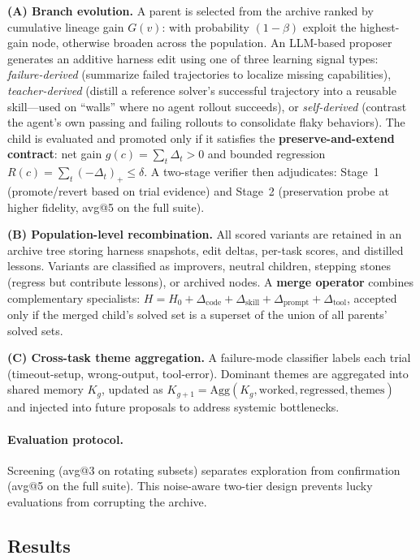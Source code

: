 \documentclass[11pt,a4paper]{article}
\begin{document}
\textbf{(A) Branch evolution.} A parent is selected from the archive ranked by cumulative lineage gain $G(v)$: with probability $(1-\beta)$ exploit the highest-gain node, otherwise broaden across the population. An LLM-based proposer generates an additive harness edit using one of three learning signal types: \emph{failure-derived} (summarize failed trajectories to localize missing capabilities), \emph{teacher-derived} (distill a reference solver's successful trajectory into a reusable skill---used on ``walls'' where no agent rollout succeeds), or \emph{self-derived} (contrast the agent's own passing and failing rollouts to consolidate flaky behaviors). The child is evaluated and promoted only if it satisfies the \textbf{preserve-and-extend contract}: net gain $g(c) = \sum_t \Delta_t > 0$ and bounded regression $R(c) = \sum_t (-\Delta_t)_+ \leq \delta$. A two-stage verifier then adjudicates: Stage~1 (promote/revert based on trial evidence) and Stage~2 (preservation probe at higher fidelity, avg@5 on the full suite).

\textbf{(B) Population-level recombination.} All scored variants are retained in an archive tree storing harness snapshots, edit deltas, per-task scores, and distilled lessons. Variants are classified as improvers, neutral children, stepping stones (regress but contribute lessons), or archived nodes. A \textbf{merge operator} combines complementary specialists: $H = H_0 + \Delta_{\text{code}} + \Delta_{\text{skill}} + \Delta_{\text{prompt}} + \Delta_{\text{tool}}$, accepted only if the merged child's solved set is a superset of the union of all parents' solved sets.

\textbf{(C) Cross-task theme aggregation.} A failure-mode classifier labels each trial (timeout-setup, wrong-output, tool-error). Dominant themes are aggregated into shared memory $K_g$, updated as $K_{g+1} = \text{Agg}(K_g, \text{worked}, \text{regressed}, \text{themes})$ and injected into future proposals to address systemic bottlenecks.

\paragraph{Evaluation protocol.} Screening (avg@3 on rotating subsets) separates exploration from confirmation (avg@5 on the full suite). This noise-aware two-tier design prevents lucky evaluations from corrupting the archive.

\subsection{Results}
\end{document}
